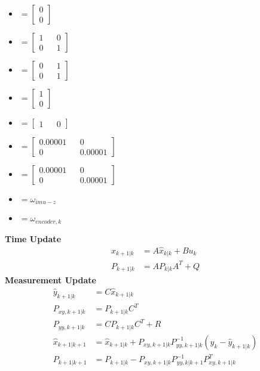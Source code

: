 	\begin{itemize}
		\item { 
			\(= \begin{bmatrix}
				0 \\
				0
			\end{bmatrix}\)}
		\item {
			\(= \begin{bmatrix}
				1 && 0\\
				0 && 1
			\end{bmatrix}\)}
		\item { 
			\(= \begin{bmatrix}
				0 && 1\\
				0 && 1
			\end{bmatrix}\)}
		\item { 
			\(= \begin{bmatrix}
				1\\
				0
			\end{bmatrix}\)}
		\item { 
			\(= \begin{bmatrix}
				1 && 0
			\end{bmatrix}\)}
		\item { 
			\(= \begin{bmatrix}
				0.00001 && 0 \\
				0 && 0.00001
			\end{bmatrix}\)}
		\item { 
			\(= \begin{bmatrix}
				0.00001 && 0 \\
				0 && 0.00001
			\end{bmatrix}\)}
		\item { \(= \omega_{imu-z}\)}
		\item { \(= \omega_{encoder,k}\)}
	\end{itemize}
	\textbf{Time Update} \\
	\[
	\begin{split}
		\hat{x}_{k+1|k} &= A\hat{x}_{k|k} + Bu_k \\
		P_{k+1|k} &= AP_{k|k}A^T + Q
	\end{split}
	\]
	\textbf{Measurement Update} \\
	\[
	\begin{split}
		\hat{y}_{k+1|k} &= C\hat{x}_{k+1|k} \\
		P_{xy,k+1|k} &= P_{k+1|k}C^T  \\
		P_{yy,k+1|k} &= CP_{k+1|k}C^T + R \\
		\hat{x}_{k+1|k+1} &= \hat{x}_{k+1|k} + P_{xy,k+1|k}P^{-1}_{yy,k+1|k}(y_k - \hat{y}_{k+1|k}) \\
		P_{k+1|k+1} &= P_{k+1|k} - P_{xy,k+1|k}P^{-1}_{yy,k|k+1}P^T_{xy,k+1|k}
	\end{split}
	\]
	
